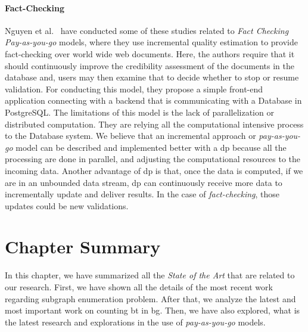 \paragraph{Fact-Checking} Nguyen et al.~\cite{factcatch} have conducted some of these studies related to \emph{Fact Checking Pay-as-you-go} models, where they use incremental quality estimation to provide fact-checking over world wide web documents.
Here, the authors require that it should continuously improve the credibility assessment of the documents in the database and, users may then examine that to decide whether to stop or resume validation.
For conducting this model, they propose a simple front-end application connecting with a backend that is communicating with a Database in PostgreSQL. 
The limitations of this model is the lack of parallelization or distributed computation. They are relying all the computational intensive process to the Database system. 
We believe that an incremental approach or \emph{pay-as-you-go} model can be described and implemented better with a \acrshort{dp} because all the processing are done in parallel, and adjusting the computational resources to the incoming data.
Another advantage of \acrshort{dp} is that, once the data is computed, if we are in an unbounded data stream, \acrshort{dp} can continuously receive more data to incrementally update and deliver results. 
In the case of \emph{fact-checking}, those updates could be new validations.

\section{Chapter Summary}
In this chapter, we have summarized all the \emph{State of the Art} that are related to our research.
First, we have shown all the details of the most recent work regarding subgraph enumeration problem. 
After that, we analyze the latest and most important work on counting \acrlong{bt} in \acrlong{bg}.
Then, we have also explored, what is the latest research and explorations in the use of \emph{pay-as-you-go} models.
